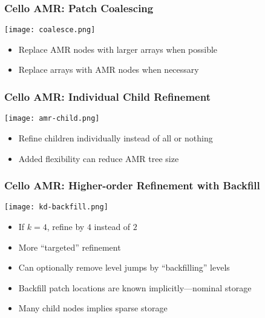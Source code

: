 \begin{frame}[fragile] \frametitle{Cello AMR: Patch Coalescing}
\centerline{\texttt{[image: coalesce.png]}}
\begin{itemize}
\item Replace AMR nodes with larger arrays when possible
\item Replace arrays with AMR nodes when necessary
\end{itemize}
\end{frame}

\begin{frame}[fragile] \frametitle{Cello AMR: Individual Child Refinement}
\centerline{\texttt{[image: amr-child.png]}}
\begin{itemize}
\item Refine children individually instead of all or nothing
\item Added flexibility can reduce AMR tree size
\end{itemize}
\end{frame}

\begin{frame}[fragile] \frametitle{Cello AMR: Higher-order Refinement with Backfill}
\centerline{\texttt{[image: kd-backfill.png]}}
\begin{itemize}
\item If $k=4$, refine by $4$ instead of $2$
\item More ``targeted'' refinement
\item Can optionally remove level jumps by ``backfilling'' levels
\item Backfill patch locations are known implicitly---nominal storage
\item Many child nodes implies sparse storage
\end{itemize}
\end{frame}
